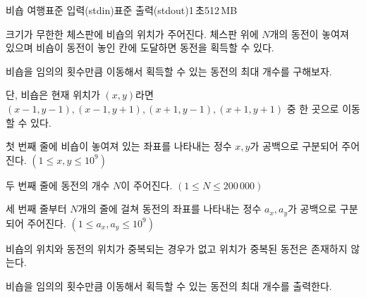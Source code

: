 \begin{problem}{비숍 여행}{표준 입력(stdin)}{표준 출력(stdout)}{1\,초}{512\,MB}


크기가 무한한 체스판에 비숍의 위치가 주어진다. 체스판 위에 $N$개의 동전이 놓여져 있으며 비숍이 동전이 놓인 칸에 도달하면 동전을 획득할 수 있다.

비숍을 임의의 횟수만큼 이동해서 획득할 수 있는 동전의 최대 개수를 구해보자.

단, 비숍은 현재 위치가 $(x,y)$라면 $(x-1, y-1), (x-1, y+1), (x+1, y-1), (x+1, y+1)$ 중 한 곳으로 이동할 수 있다.

\InputFile
첫 번째 줄에 비숍이 놓여져 있는 좌표를 나타내는 정수 $x,y$가 공백으로 구분되어 주어진다. $(1 \le x, y \le 10^9)$

두 번째 줄에 동전의 개수 $N$이 주어진다. $(1 \le N \le 200\,000)$

세 번째 줄부터 $N$개의 줄에 걸쳐 동전의 좌표를 나타내는 정수 $a_x, a_y$가 공백으로 구분되어 주어진다. $(1 \le a_x, a_y \le 10^9)$

비숍의 위치와 동전의 위치가 중복되는 경우가 없고 위치가 중복된 동전은 존재하지 않는다.

\OutputFile
비숍을 임의의 횟수만큼 이동해서 획득할 수 있는 동전의 최대 개수를 출력한다.

\Examples

\begin{example}
%
%
\end{example}

\end{problem}
